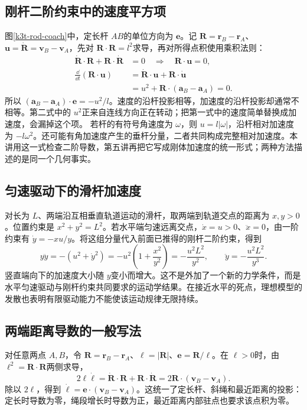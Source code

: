 \subsection{刚杆二阶约束中的速度平方项}
图\ref{k3t-rod-coach}中，定长杆 $AB$的单位方向为 $\bm e$。记 $\bm R=\bm r_B-\bm r_A$、$\bm u=\dot{\bm R}=\bm v_B-\bm v_A$，先对 $\bm R\cdot\bm R=l^2$求导，再对所得点积使用乘积法则：
\begin{align*}
 \dot{\bm R}\cdot\bm R+\bm R\cdot\dot{\bm R}&=0
 \quad\Longrightarrow\quad \bm R\cdot\bm u=0,\\
 \frac{\dd}{\dd t}(\bm R\cdot\bm u)
 &=\dot{\bm R}\cdot\bm u+\bm R\cdot\dot{\bm u}\\
 &=u^2+\bm R\cdot(\bm a_B-\bm a_A)=0.
\end{align*}
所以 $(\bm a_B-\bm a_A)\cdot\bm e=-u^2/l$。速度的沿杆投影相等，加速度的沿杆投影却通常不相等。第二式中的 $u^2$正来自连线方向正在转动；把第一式中的速度简单替换成加速度，会漏掉这个项。
若杆的有符号角速度为 $\omega$，则 $u=l|\omega|$，沿杆相对加速度为 $-l\omega^2$。还可能有角加速度产生的垂杆分量，二者共同构成完整相对加速度。本讲用这一式检查二阶导数，第五讲再把它写成刚体加速度的统一形式；两种方法描述的是同一个几何事实。

\subsection{匀速驱动下的滑杆加速度}
对长为 $L$、两端沿互相垂直轨道运动的滑杆，取两端到轨道交点的距离为 $x,y>0$。位置约束是 $x^2+y^2=L^2$。若水平端匀速远离交点，$\dot x=u>0$、$\ddot x=0$，由一阶约束有 $\dot y=-xu/y$。将这组分量代入前面已推得的刚杆二阶约束，得到
\[y\ddot y=-(u^2+\dot y^2)
 =-u^2\left(1+\frac{x^2}{y^2}\right)
 =-\frac{u^2L^2}{y^2},\qquad
\ddot y=-\frac{u^2L^2}{y^3}.\]
竖直端向下的加速度大小随 $y$变小而增大。这不是外加了一个新的力学条件，而是水平匀速驱动与刚杆约束共同要求的运动学结果。在接近水平的死点，理想模型的发散也表明有限驱动能力不能使该运动规律无限持续。


\subsection{两端距离导数的一般写法}
对任意两点 $A,B$，令 $\bm R=\bm r_B-\bm r_A$、$\ell=|\bm R|$、$\bm e=\bm R/\ell$。在 $\ell>0$时，由 $\ell^2=\bm R\cdot\bm R$两侧求导，
\[
 2\ell\dot\ell=\dot{\bm R}\cdot\bm R+\bm R\cdot\dot{\bm R}
 =2\bm R\cdot(\bm v_B-\bm v_A).
\]
除以 $2\ell$，得到 $\dot\ell=\bm e\cdot(\bm v_B-\bm v_A)$。这统一了定长杆、斜绳和最近距离的投影：定长时导数为零，绳段增长时导数为正，最近距离内部驻点也要求该点积为零。

